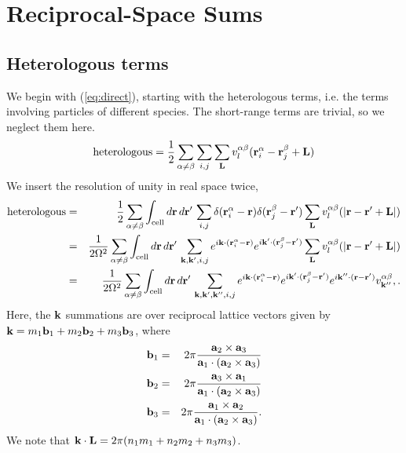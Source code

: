 \documentclass{article}
\begin{document}
\section{Reciprocal-Space Sums}
\subsection{Heterologous terms}
We begin with (\ref{eq:direct}), starting with the heterologous terms,
i.e. the terms involving particles of different species.  The
short-range terms are trivial, so we neglect them here.
\begin{equation}
\text{heterologous} = \frac{1}{2} \sum_{\alpha \neq \beta} \sum_{i,j} \sum_{\mathbf{L}}
v^{\alpha\beta}_l(\mathbf{r}_i^\alpha - \mathbf{r}_j^\beta + \mathbf{L})
\end{equation}
We insert the resolution of unity in real space twice,
\begin{eqnarray}
\text{heterologous} & = & \frac{1}{2}\sum_{\alpha \neq \beta} \int_\text{cell} d\mathbf{r} \, d\mathbf{r}' \, \sum_{i,j}
\delta(\mathbf{r}_i^\alpha - \mathbf{r}) \delta(\mathbf{r}_j^\beta-\mathbf{r}') \sum_{\mathbf{L}}
v^{\alpha\beta}_l(|\mathbf{r} - \mathbf{r}' + \mathbf{L}|) \\
& = & \frac{1}{2\Omega^2}\sum_{\alpha \neq \beta} \int_\text{cell} d\mathbf{r} \, d\mathbf{r}' \, \sum_{\mathbf{k}, \mathbf{k}', i, j} e^{i\mathbf{k}\cdot(\mathbf{r}_i^\alpha
  - \mathbf{r})} e^{i\mathbf{k}'\cdot(\mathbf{r}_j^\beta - \mathbf{r}')} \sum_{\mathbf{L}}
v^{\alpha\beta}_l(|\mathbf{r} - \mathbf{r}' + \mathbf{L}|) \nonumber \\
& = & \frac{1}{2\Omega^2} \sum_{\alpha \neq \beta} \int_\text{cell} d\mathbf{r} \, d\mathbf{r}'\,
\sum_{\mathbf{k}, \mathbf{k}', \mathbf{k}'', i, j} e^{i\mathbf{k}\cdot(\mathbf{r}_i^\alpha - \mathbf{r})}
e^{i\mathbf{k}'\cdot(\mathbf{r}_j^\beta-\mathbf{r}')} e^{i\mathbf{k}''\cdot(\mathbf{r} -\mathbf{r}')}
v^{\alpha\beta}_{\mathbf{k}''}, \nonumber.
\end{eqnarray}
Here, the $\mathbf{k}$ summations are over reciprocal lattice vectors given
by $\mathbf{k} = m_1 \mathbf{b}_1 + m_2\mathbf{b}_2 + m_3\mathbf{b}_3$, where
\begin{eqnarray}
\mathbf{b}_1 & = & 2\pi \frac{\mathbf{a}_2 \times \mathbf{a}_3}{\mathbf{a}_1 \cdot (\mathbf{a}_2 \times
  \mathbf{a}_3)} \nonumber \\
\mathbf{b}_2 & = & 2\pi \frac{\mathbf{a}_3 \times \mathbf{a}_1}{\mathbf{a}_1 \cdot (\mathbf{a}_2 \times
  \mathbf{a}_3)} \\
\mathbf{b}_3 & = & 2\pi \frac{\mathbf{a}_1 \times \mathbf{a}_2}{\mathbf{a}_1 \cdot (\mathbf{a}_2 \times
  \mathbf{a}_3)} \nonumber.
\end{eqnarray}
We note that $\mathbf{k} \cdot \mathbf{L} = 2\pi(n_1 m_1 + n_2 m_2 + n_3 m_3)$. 
\end{document}
